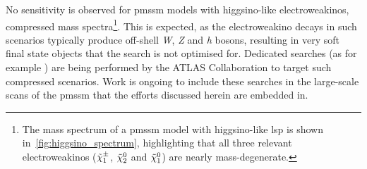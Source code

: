 No sensitivity is observed for \gls{pmssm} models with higgsino-like electroweakinos, \ie compressed mass spectra\footnote{The mass spectrum of a \gls{pmssm} model with higgsino-like \gls{lsp} is shown in~\cref{fig:higgsino_spectrum}, highlighting that all three relevant electroweakinos ($\tilde{\chi}_1^\pm$, $\tilde{\chi}_2^0$ and $\tilde{\chi}_1^0$) are nearly mass-degenerate.}. This is expected, as the electroweakino decays in such scenarios typically produce off-shell \textit{W}, \textit{Z} and \textit{h} bosons, resulting in very soft final state objects that the \onelepton search is not optimised for. Dedicated searches (as for example \cite{SUSY-2018-16}) are being performed by the ATLAS Collaboration to target such compressed scenarios. Work is ongoing to include these searches in the large-scale scans of the \gls{pmssm} that the efforts discussed herein are embedded in.

